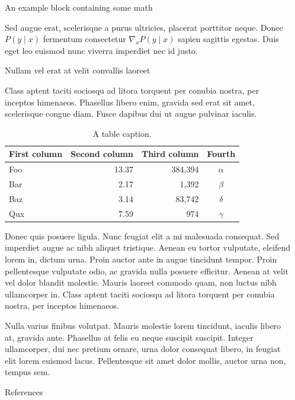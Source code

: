 \documentclass[final]{beamer}
\newlength{\sepwidth}
\newlength{\colwidth}
\newcommand{\separatorcolumn}{\begin{column}{\sepwidth}\end{column}}
\begin{document}
\begin{frame}[t]
\begin{columns}[t]
\begin{column}{\colwidth}
\begin{exampleblock}{An example block containing some math}{}
				
				Sed augue erat, scelerisque a purus ultricies, placerat porttitor neque.
				Donec $P(y \mid x)$ fermentum consectetur $\nabla_x P(y \mid x)$ sapien
				sagittis egestas. Duis eget leo euismod nunc viverra imperdiet nec id
				justo.
				
			\end{exampleblock}
			
			\begin{block}{Nullam vel erat at velit convallis laoreet}
				
				Class aptent taciti sociosqu ad litora torquent per conubia nostra, per
				inceptos himenaeos. Phasellus libero enim, gravida sed erat sit amet,
				scelerisque congue diam. Fusce dapibus dui ut augue pulvinar iaculis.
				
				\begin{table}
					\centering
					\begin{tabular}{l r r c}
						\toprule
						\textbf{First column} & \textbf{Second column} & \textbf{Third column} & \textbf{Fourth} \\
						\midrule
						Foo & 13.37 & 384,394 & $\alpha$ \\
						Bar & 2.17 & 1,392 & $\beta$ \\
						Baz & 3.14 & 83,742 & $\delta$ \\
						Qux & 7.59 & 974 & $\gamma$ \\
						\bottomrule
					\end{tabular}
					\caption{A table caption.}
				\end{table}
				
				Donec quis posuere ligula. Nunc feugiat elit a mi malesuada consequat. Sed
				imperdiet augue ac nibh aliquet tristique. Aenean eu tortor vulputate,
				eleifend lorem in, dictum urna. Proin auctor ante in augue tincidunt
				tempor. Proin pellentesque vulputate odio, ac gravida nulla posuere
				efficitur. Aenean at velit vel dolor blandit molestie. Mauris laoreet
				commodo quam, non luctus nibh ullamcorper in. Class aptent taciti sociosqu
				ad litora torquent per conubia nostra, per inceptos himenaeos.
				
				Nulla varius finibus volutpat. Mauris molestie lorem tincidunt, iaculis
				libero at, gravida ante. Phasellus at felis eu neque suscipit suscipit.
				Integer ullamcorper, dui nec pretium ornare, urna dolor consequat libero,
				in feugiat elit lorem euismod lacus. Pellentesque sit amet dolor mollis,
				auctor urna non, tempus sem.
				
			\end{block}
			
			
			\begin{block}{References}
				\printbibliography[heading=none]
			\end{block}
		\end{column}
		
		\separatorcolumn
	\end{columns}
\end{frame}
\end{document}
